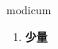 
\begin{frame}
{\huge modicum}
\begin{center}
\begin{enumerate}\Large
  \item \textbf{少量}
\end{enumerate}
\end{center}
\end{frame}
